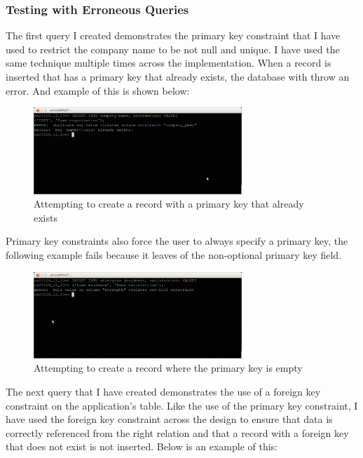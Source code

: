 \documentclass{article}
\begin{document}
\subsubsection{Testing with Erroneous Queries}
The first query I created demonstrates the primary key constraint that I have used to restrict the company name to be not null and unique. I have used the same technique multiple times across the implementation. When a record is inserted that has a primary key that already exists, the database with throw an error. And example of this is shown below:

\begin{figure}[H]
\centering
\includegraphics[width=0.7\textwidth]{img/test/test-pkey.png}
\caption{Attempting to create a record with a primary key that already exists}
\label{fig:test-pkey}
\end{figure}

Primary key constraints also force the user to always specify a primary key, the following example fails because it leaves of the non-optional primary key field.

\begin{figure}[H]
\centering
\includegraphics[width=0.7\textwidth]{img/test/test-pkey-empty.png}
\caption{Attempting to create a record where the primary key is empty}
\label{fig:test-pkey-empty}
\end{figure}

The next query that I have created demonstrates the use of a foreign key constraint on the application's table. Like the use of the primary key constraint, I have used the foreign key constraint across the design to ensure that data is correctly referenced from the right relation and that a record with a foreign key that does not exist is not inserted. Below is an example of this:
\end{document}
